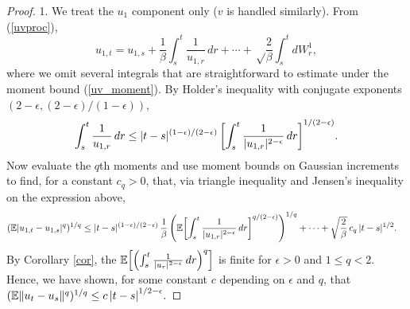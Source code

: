 \documentclass[11pt, twoside]{report}
\begin{document}
\begin{proof}   
 1. We treat the $u_1$ component only ($v$ is handled similarly). From (\ref{uvproc}),
\[
u_{1,t}=u_{1,s}+\frac 1\beta\int_s^t \frac{1}{ u_{1,r}}\,dr + \cdots+ \sqrt\frac{2}\beta\int_s^t dW^1_r,
\]
where we omit several integrals that are straightforward to estimate under the moment bound (\ref{uv_moment}). By Holder's inequality with conjugate exponents $(2-\epsilon, (2-\epsilon)/(1-\epsilon))$,
\[
\int_s^t \frac{1}{ u_{1,r}}\,dr 
\le |t-s|^{(1-\epsilon)/(2-\epsilon)}\,  {\left[\int_s^t\frac{1}{|u_{1,r}|^{2-\epsilon}} \,dr\right]^{1/(2-\epsilon)}}.
\]
Now evaluate the $q$th moments and use moment bounds on Gaussian increments to find, for a constant $c_q>0$, that, via triangle inequality and Jensen's inequality on the expression above,
\begin{align*}
(\mathbb E |u_{1,t}-u_{1,s}|^q)^{1/q}
&\le |t-s|^{(1-\epsilon)/(2-\epsilon)}\,\frac 1\beta\,  \pp{\mathbb{E} \bp{\int_s^t\frac{1}{|u_{1,r}|^{2-\epsilon}} \,dr}^{q/(2-\epsilon)}}^{1/q} + \cdots+\sqrt{\frac 2\beta}\,c_q\,|t-s|^{1/2}.
\end{align*}
By Corollary \ref{cor}, the $\mathbb{E} \bp{\pp{\int_s^t\frac{1}{|u_r|^{2-\epsilon}} \,dr}^q}$ is finite for $\epsilon>0$ and $1 \le q < 2$. Hence, we have shown, for some constant $c$ depending on $\epsilon$ and $q$, that
$(\mathbb E \|u_t-u_s\|^q)^{1/q}\le c\,\abs{t-s}^{1/2-\epsilon}.
$


\end{proof}
\end{document}
